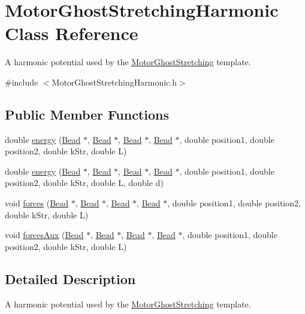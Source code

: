 \hypertarget{classMotorGhostStretchingHarmonic}{\section{Motor\+Ghost\+Stretching\+Harmonic Class Reference}
\label{classMotorGhostStretchingHarmonic}
}


A harmonic potential used by the \hyperlink{classMotorGhostStretching}{Motor\+Ghost\+Stretching} template.  




{\ttfamily \#include $<$Motor\+Ghost\+Stretching\+Harmonic.\+h$>$}

\subsection*{Public Member Functions}
\begin{DoxyCompactItemize}
\item 
double \hyperlink{classMotorGhostStretchingHarmonic_a61ddf9b84ab132104cbb17262a6f254c}{energy} (\hyperlink{classBead}{Bead} $\ast$, \hyperlink{classBead}{Bead} $\ast$, \hyperlink{classBead}{Bead} $\ast$, \hyperlink{classBead}{Bead} $\ast$, double position1, double position2, double k\+Str, double L)
\item 
double \hyperlink{classMotorGhostStretchingHarmonic_a1cf12c1c053fe1b4e2de5f497f727063}{energy} (\hyperlink{classBead}{Bead} $\ast$, \hyperlink{classBead}{Bead} $\ast$, \hyperlink{classBead}{Bead} $\ast$, \hyperlink{classBead}{Bead} $\ast$, double position1, double position2, double k\+Str, double L, double d)
\item 
void \hyperlink{classMotorGhostStretchingHarmonic_a473690f82dac6d091f9118934cc906b7}{forces} (\hyperlink{classBead}{Bead} $\ast$, \hyperlink{classBead}{Bead} $\ast$, \hyperlink{classBead}{Bead} $\ast$, \hyperlink{classBead}{Bead} $\ast$, double position1, double position2, double k\+Str, double L)
\item 
void \hyperlink{classMotorGhostStretchingHarmonic_ac85579b270d57fc8b67c34870b1bcc44}{forces\+Aux} (\hyperlink{classBead}{Bead} $\ast$, \hyperlink{classBead}{Bead} $\ast$, \hyperlink{classBead}{Bead} $\ast$, \hyperlink{classBead}{Bead} $\ast$, double position1, double position2, double k\+Str, double L)
\end{DoxyCompactItemize}


\subsection{Detailed Description}
A harmonic potential used by the \hyperlink{classMotorGhostStretching}{Motor\+Ghost\+Stretching} template. 

